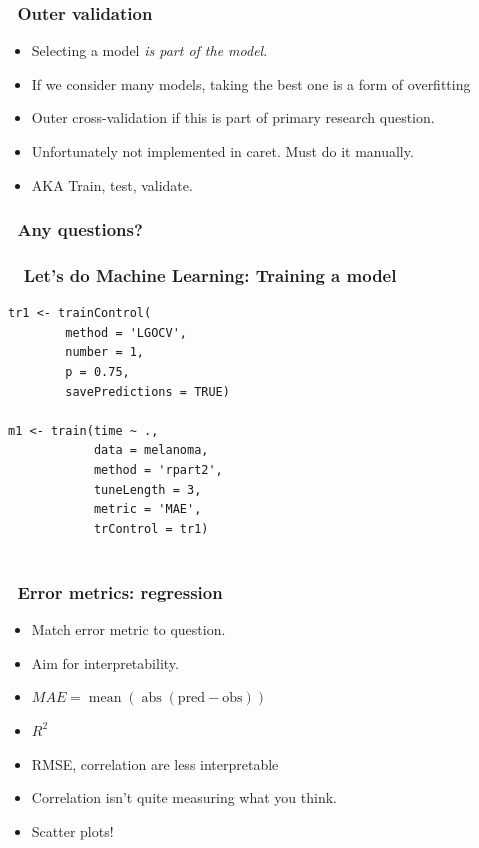 \documentclass[handout, aspectratio = 169]{beamer}
\begin{document}
\begin{frame}
\frametitle{\insertframenumber~Outer validation}

\begin{itemize}
\item Selecting a model \emph{is part of the model}.
\item If we consider many models, taking the best one is a form of overfitting
\item Outer cross-validation if this is part of primary research question.
\item Unfortunately not implemented in caret. Must do it manually.
\item AKA Train, test, validate.
\end{itemize}
\end{frame} 






\begin{frame}
\frametitle{\insertframenumber~Any questions?}


\end{frame} 





\begin{frame}[fragile]
\frametitle{\insertframenumber~ Let's do Machine Learning: Training a model}
\renewcommand{\FancyVerbFormatLine}[1]{%
   \ifnum\value{FancyVerbLine}=11\color{cyan}#1%
   \else #1\fi}
\begin{Verbatim}
tr1 <- trainControl(
        method = 'LGOCV',
        number = 1,
        p = 0.75,
        savePredictions = TRUE)

m1 <- train(time ~ ., 
            data = melanoma,
            method = 'rpart2',
            tuneLength = 3,
            metric = 'MAE',
            trControl = tr1)
            
\end{Verbatim}

\end{frame} 


\begin{frame}
\frametitle{\insertframenumber~Error metrics: regression}

\begin{itemize}
\item Match error metric to question.
\item Aim for interpretability.
\item $MAE = \operatorname{mean}(\operatorname{abs}(\text{pred} - \text{obs})) $
\item $R^2$
\item RMSE, correlation are less interpretable
\item Correlation isn't quite measuring what you think.
\item Scatter plots!
\end{itemize}
\end{frame} 
\end{document}
